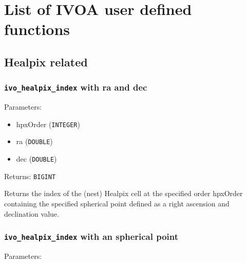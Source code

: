\documentclass[11pt,a4paper]{ivoa}
\begin{document}





\section{List of IVOA user defined functions}
\subsection{Healpix related}
\subsubsection{\texttt{ivo\_healpix\_index} with ra and dec}

Parameters:

\begin{itemize}
	\item hpxOrder (\texttt{INTEGER})
	\item ra (\texttt{DOUBLE})
	\item dec (\texttt{DOUBLE})
\end{itemize}

Returns: \texttt{BIGINT}

Returns the index of the (nest) Healpix cell at the specified order
hpxOrder containing the specified spherical point defined as a right
ascension and declination value.

\subsubsection{\texttt{ivo\_healpix\_index} with an spherical point}

Parameters:
\end{document}
